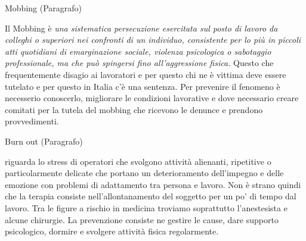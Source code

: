 \documentclass[]{article}
\begin{document}
Mobbing (Paragrafo)

Il Mobbing è \emph{una sistematica persecuzione esercitata sul posto di
lavoro da colleghi o superiori nei confronti di un individuo,
consistente per lo più in piccoli atti quotidiani di emarginazione
sociale, violenza psicologica o sabotaggio professionale, ma che può
spingersi fino all'aggressione fisica.} Questo che frequentemente
disagio ai lavoratori e per questo chi ne è vittima deve essere tutelato
e per questo in Italia c'è una sentenza. Per prevenire il fenomeno è
necesserio conoscerlo, migliorare le condizioni lavorative e dove
necessario creare comitati per la tutela del mobbing che ricevono le
denunce e prendono provvedimenti.

Burn out (Paragrafo)

riguarda lo stress di operatori che svolgono attività alienanti,
ripetitive o particolarmente delicate che portano un deterioramento
dell'impegno e delle emozione con problemi di adattamento tra persona e
lavoro. Non è strano quindi che la terapia consiste nell'allontanamento
del soggetto per un po' di tempo dal lavoro. Tra le figure a rischio in
medicina troviamo soprattutto l'anestesista e alcune chirurgie. La
prevenzione consiste ne gestire le cause, dare supporto psicologico,
dormire e svolgere attività fisica regolarmente.
\end{document}
